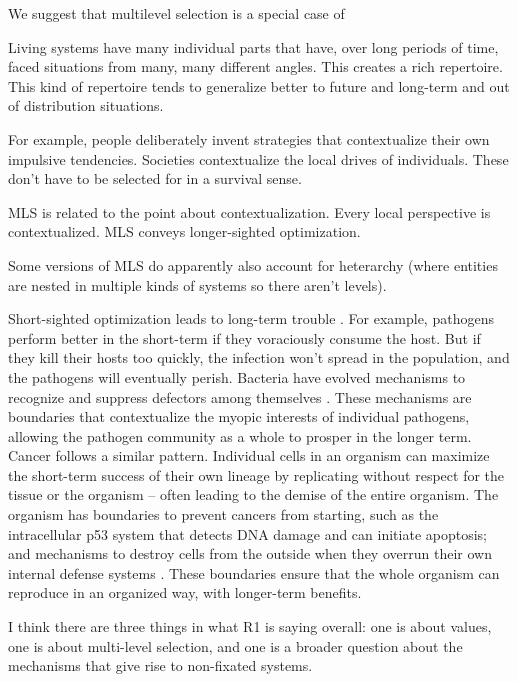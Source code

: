 \documentclass[fontsize=11.5pt]{scrartcl}
\newcounter{point}
\begin{document}
We suggest that multilevel selection is a special case of

Living systems have many individual parts that have, over long periods of time, faced situations from many, many different angles. This creates a rich repertoire. This kind of repertoire tends to generalize better to future and long-term and out of distribution situations.

For example, people deliberately invent strategies that contextualize their own impulsive tendencies. Societies contextualize the local drives of individuals. These don't have to be selected for in a survival sense.

MLS is related to the point about contextualization. Every local perspective is contextualized. MLS conveys longer-sighted optimization.

Some versions of MLS do apparently also account for heterarchy (where entities are nested in multiple kinds of systems so there aren't levels).

Short-sighted optimization leads to long-term trouble \citep{dawkins1976selfish, traulsen2006evolution, wilson1980natural, wagner1996perspective}. For example, pathogens perform better in the short-term if they voraciously consume the host. But if they kill their hosts too quickly, the infection won't spread in the population, and the pathogens will eventually perish. Bacteria have evolved mechanisms to recognize and suppress defectors among themselves \citep{west2006social}. These mechanisms are boundaries that contextualize the myopic interests of individual pathogens, allowing the pathogen community as a whole to prosper in the longer term. Cancer follows a similar pattern. Individual cells in an organism can maximize the short-term success of their own lineage by replicating without respect for the tissue or the organism -- often leading to the demise of the entire organism. The organism has boundaries to prevent cancers from starting, such as the intracellular p53 system that detects DNA damage and can initiate apoptosis; and mechanisms to destroy cells from the outside when they overrun their own internal defense systems \citep{hanahan2000hallmarks, schreiber2011cancer}. These boundaries ensure that the whole organism can reproduce in an organized way, with longer-term benefits.

I think there are three things in what R1 is saying overall: one is about values, one is about multi-level selection, and one is a broader question about the mechanisms that give rise to non-fixated systems.
\end{document}
